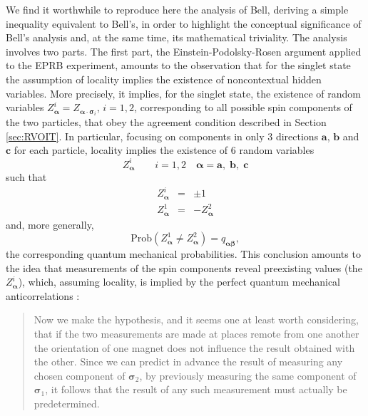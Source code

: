 \documentclass[12pt]{article}
\begin{document}
We find it worthwhile to reproduce here the analysis of Bell, deriving
a simple inequality equivalent to Bell's, in order to highlight the
conceptual significance of Bell's analysis and, at the same time, its
mathematical triviality.  The analysis involves two parts. The first
part, the Einstein-Podolsky-Rosen argument applied to the EPRB
experiment, amounts to the observation that for the singlet state the
assumption of locality implies the existence of noncontextual hidden
variables.  More precisely, it implies, for the singlet state, the
existence of random variables $ Z^{i}_{\boldsymbol{\alpha}}=
Z_{\boldsymbol{\alpha}\cdot \boldsymbol{\sigma}_i}$, $i=1, 2$,
corresponding to all possible spin components of the two particles,
that obey the agreement condition described in Section
\ref{sec:RVOIT}.  In particular, focusing on components in only 3
directions $\mathbf{a}$, $\mathbf{b}$ and $\mathbf{c}$ for each
particle, locality implies the existence of 6 random variables
$$
Z^{i}_{\boldsymbol{\alpha}}\qquad i=1,2\quad {\boldsymbol{\alpha}}=
\mathbf{a},\; \mathbf{b},\; \mathbf{c}
$$
such that
\begin{eqnarray}
Z^{i}_{\boldsymbol{\alpha}} &=& \pm 1  \label{eq:pc1}\\
Z^{1}_{{\boldsymbol{\alpha}}}& =&
-Z^{2}_{{\boldsymbol{\alpha}}}\label{eq:pc2}
\end{eqnarray}
and, more generally,
\begin{equation}
\text{Prob}(Z^{1}_{\boldsymbol{\alpha}}\neq
Z^{2}_{\boldsymbol{\alpha}}) =
q_{ {\boldsymbol{\alpha}}
   {\boldsymbol{\beta}}   }, \label{eq:pc3}
\end{equation}
the corresponding quantum mechanical probabilities. This conclusion
amounts to the idea that measurements of the spin components reveal
preexisting values (the $Z^{i}_{\boldsymbol{\alpha}}$), which,
assuming locality, is implied by the perfect quantum mechanical
anticorrelations \cite{Bel64}:
\begin{quotation}\setlength{\baselineskip}{12pt}\noindent
   Now we make the hypothesis, and it seems one at least worth
   considering, that if the two measurements are made at places remote
   {}from one another the orientation of one magnet does not influence
   the result obtained with the other. Since we can predict in advance
   the result of measuring any chosen component of
   ${\boldsymbol{\sigma}}_2$, by previously measuring the same
   component of ${\boldsymbol{\sigma}}_1$, it follows that the result
   of any such measurement must actually be predetermined.
\end{quotation}
\end{document}
